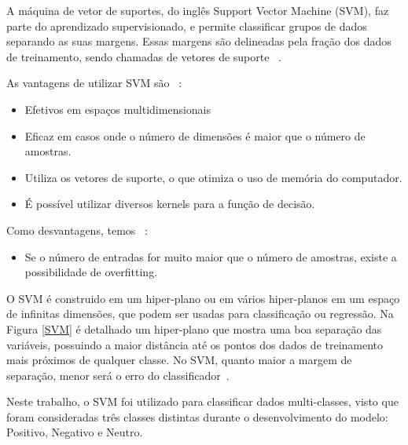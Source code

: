         A máquina de vetor de suportes, do inglês Support Vector Machine (\acrshort{SVM}), faz parte do aprendizado supervisionado, e permite
        classificar grupos de dados separando as suas margens. Essas margens são delineadas pela fração dos dados de treinamento, sendo chamadas de vetores de suporte ~\cite{chang2011libsvm}.

        As vantagens de utilizar \acrshort{SVM} são ~\cite{pedregosa2011scikit}:

        \begin{itemize}

          \item Efetivos em espaços multidimensionais
          \item Eficaz em casos onde o número de dimensões é maior que o número de amostras.
          \item Utiliza os vetores de suporte, o que otimiza o uso de memória do computador.
          \item É possível utilizar diversos kernels para a função de decisão.

        \end{itemize}

        Como desvantagens, temos ~\cite{pedregosa2011scikit}:

        \begin{itemize}

          \item Se o número de entradas for muito maior que o número de amostras, existe a possibilidade de overfitting.

        \end{itemize}
        
        O \acrshort{SVM} é construido em um hiper-plano ou em vários hiper-planos em um espaço de infinitas dimensões, que podem ser
        usadas para classificação ou regressão. Na Figura \ref{SVM} é detalhado um hiper-plano que mostra uma boa separação das variáveis, possuindo a maior distância 
        até os pontos dos dados de treinamento mais próximos de qualquer classe. No \acrshort{SVM}, quanto maior a margem de separação, 
        menor será o erro do classificador~\cite{vieira2017plantrna_sniffer}. 
        

        Neste trabalho, o SVM foi utilizado para classificar dados multi-classes, visto que foram consideradas três classes distintas durante o desenvolvimento do modelo: Positivo, Negativo e Neutro.
        
